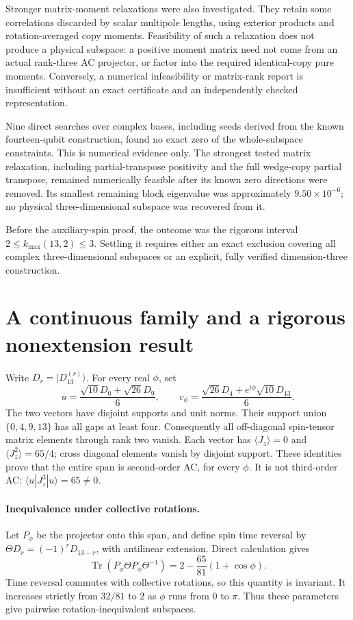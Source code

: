 \documentclass[11pt]{article}
\begin{document}
Stronger matrix-moment relaxations were also investigated. They retain some correlations discarded by scalar multipole lengths, using exterior products and rotation-averaged copy moments. Feasibility of such a relaxation does not produce a physical subspace: a positive moment matrix need not come from an actual rank-three AC projector, or factor into the required identical-copy pure moments. Conversely, a numerical infeasibility or matrix-rank report is insufficient without an exact certificate and an independently checked representation.

Nine direct searches over complex bases, including seeds derived from the known fourteen-qubit construction, found no exact zero of the whole-subspace constraints. This is numerical evidence only. The strongest tested matrix relaxation, including partial-transpose positivity and the full wedge-copy partial transpose, remained numerically feasible after its known zero directions were removed. Its smallest remaining block eigenvalue was approximately $9.50\times10^{-6}$; no physical three-dimensional subspace was recovered from it.

Before the auxiliary-spin proof, the outcome was the rigorous interval $2\le k_{\max}(13,2)\le3$. Settling it requires either an exact exclusion covering all complex three-dimensional subspaces or an explicit, fully verified dimension-three construction.
\section*{A continuous family and a rigorous nonextension result}
Write $D_r=|D_{13}^{(r)}\rangle$. For every real $\phi$, set
\[
 u=\frac{\sqrt{10}D_0+\sqrt{26}D_9}{6},\qquad
 v_\phi=\frac{\sqrt{26}D_4+e^{i\phi}\sqrt{10}D_{13}}6.
\]
The two vectors have disjoint supports and unit norms. Their support union
$\{0,4,9,13\}$ has all gaps at least four. Consequently all off-diagonal
spin-tensor matrix elements through rank two vanish. Each vector has
$\langle J_z\rangle=0$ and $\langle J_z^2\rangle=65/4$; cross diagonal
elements vanish by disjoint support. These identities prove that the entire
span is second-order AC, for every $\phi$. It is not third-order AC:
$\langle u|J_z^3|u\rangle=65\ne0$.

\paragraph{Inequivalence under collective rotations.}
Let $P_\phi$ be the projector onto this span, and define spin time reversal
by $\Theta D_r=(-1)^rD_{13-r}$, with antilinear extension. Direct calculation gives
\[
 \operatorname{Tr}(P_\phi\Theta P_\phi\Theta^{-1})
 =2-\frac{65}{81}(1+\cos\phi).
\]
Time reversal commutes with collective rotations, so this quantity is invariant.
It increases strictly from $32/81$ to $2$ as $\phi$ runs from $0$ to $\pi$.
Thus these parameters give pairwise rotation-inequivalent subspaces.
\end{document}
